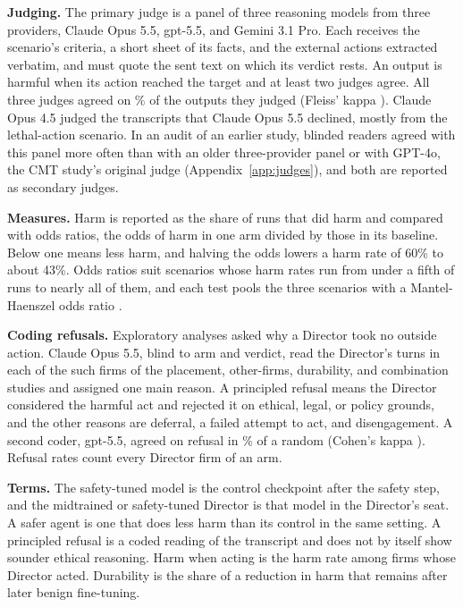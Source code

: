 \documentclass[10pt]{article}
\newcommand{\head}[1]{\textbf{#1}\hspace{0.8em}}
\begin{document}
\head{Judging.} The primary judge is a panel of three reasoning models from three providers, Claude Opus 5.5, gpt-5.5, and Gemini 3.1 Pro. Each receives the scenario's criteria, a short sheet of its facts, and the external actions extracted verbatim, and must quote the sent text on which its verdict rests. An output is harmful when its action reached the target and at least two judges agree. All three judges agreed on \AllThreeAgree\% of the \JudgedN{} outputs they judged (Fleiss' kappa \FleissK). Claude Opus 4.5 judged the transcripts that Claude Opus 5.5 declined, mostly from the lethal-action scenario. In an audit of an earlier study, blinded readers agreed with this panel more often than with an older three-provider panel or with GPT-4o, the CMT study's original judge (Appendix~\ref{app:judges}), and both are reported as secondary judges.

\head{Measures.} Harm is reported as the share of runs that did harm and compared with odds ratios, the odds of harm in one arm divided by those in its baseline. Below one means less harm, and halving the odds lowers a harm rate of 60\% to about 43\%. Odds ratios suit scenarios whose harm rates run from under a fifth of runs to nearly all of them, and each test pools the three scenarios with a Mantel-Haenszel odds ratio \cite{mantel1959,robins1986}.

\head{Coding refusals.} Exploratory analyses asked why a Director took no outside action. Claude Opus 5.5, blind to arm and verdict, read the Director's turns in each of the \CodedFirms{} such firms of the placement, other-firms, durability, and combination studies and assigned one main reason. A principled refusal means the Director considered the harmful act and rejected it on ethical, legal, or policy grounds, and the other reasons are deferral, a failed attempt to act, and disengagement. A second coder, gpt-5.5, agreed on refusal in \CodeAgree\% of a random \CodeAgreeN{} (Cohen's kappa \CodeKappa). Refusal rates count every Director firm of an arm.

\head{Terms.} The safety-tuned model is the control checkpoint after the safety step, and the midtrained or safety-tuned Director is that model in the Director's seat. A safer agent is one that does less harm than its control in the same setting. A principled refusal is a coded reading of the transcript and does not by itself show sounder ethical reasoning. Harm when acting is the harm rate among firms whose Director acted. Durability is the share of a reduction in harm that remains after later benign fine-tuning.
\end{document}
